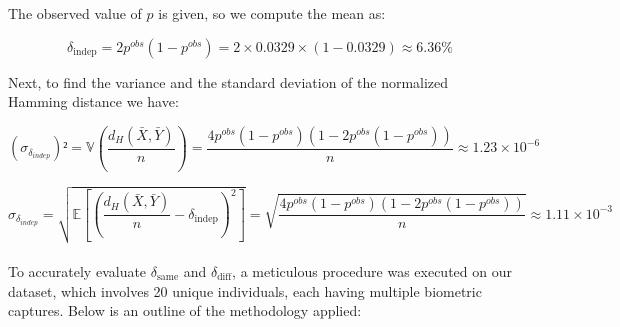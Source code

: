 The observed value of \( p \) is given, so we compute the mean as:

\[ \delta_{\text{indep}} = 2p^{obs}(1 - p^{obs}) = 2 \times 0.0329 \times (1 - 0.0329) \approx 6.36\% \]

Next, to find the variance and the standard deviation of the normalized Hamming distance we have:


\[ (\sigma_{\delta_{indep}})² = \mathbb{V}\left( \frac{d_H(\bar{X}, \bar{Y})}{n} \right) = \frac{4p^{obs}(1 - p^{obs})(1 - 2p^{obs}(1 - p^{obs}))}{n} \approx 1.23 \times 10^{-6} \]

\[ \sigma_{\delta_{indep}} = \sqrt{\mathbb{E} \left[ \left( \frac{d_H(\bar{X}, \bar{Y})}{n} - \delta_{\text{indep}} \right)^2 \right]} = \sqrt{\frac{4p^{obs}(1 - p^{obs})(1 - 2p^{obs}(1 - p^{obs}))}{n}} \approx 1.11 \times 10^{-3} \]\\

To accurately evaluate \( \delta_{\text{same}} \) and \( \delta_{\text{diff}} \), a meticulous procedure was executed on our dataset, which involves 20 unique individuals, each having multiple biometric captures. Below is an outline of the methodology applied:

